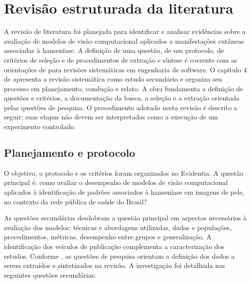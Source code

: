 \chapter{Revisão estruturada da literatura}
\label{cap:revisao-literatura}
\label{sec:conducao-revisao}

A revisão de literatura foi planejada para identificar e analisar evidências
sobre a avaliação de modelos de visão computacional aplicados a manifestações
cutâneas associadas à hanseníase. A definição de uma questão, de um protocolo,
de critérios de seleção e de procedimentos de extração e síntese é coerente
com as orientações de  para revisões sistemáticas
em engenharia de software. O capítulo 4 de  apresenta a revisão
sistemática como estudo secundário e organiza seu processo em planejamento,
condução e relato. A obra fundamenta a definição de questões e critérios,
a documentação da busca, a seleção e a extração orientada pelas questões
de pesquisa. O procedimento
adotado nesta revisão é descrito a seguir; suas etapas não devem ser
interpretadas como a execução de um experimento controlado.

\section{Planejamento e protocolo}

O objetivo, o protocolo e os critérios foram organizados no Evidentia. A
questão principal é: como avaliar o desempenho de modelos de visão
computacional aplicados à identificação de padrões associados à hanseníase
em imagens de pele, no contexto da rede pública de saúde do Brasil?

As questões secundárias desdobram a questão principal em aspectos necessários
à avaliação dos modelos: técnicas e abordagens utilizadas, dados e populações,
procedimentos, métricas, desempenho entre grupos e generalização. A
identificação dos veículos de publicação complementa a caracterização dos
estudos. Conforme , as questões de pesquisa
orientam a definição dos dados a serem extraídos e sintetizados na revisão. A
investigação foi detalhada nas seguintes questões secundárias:

